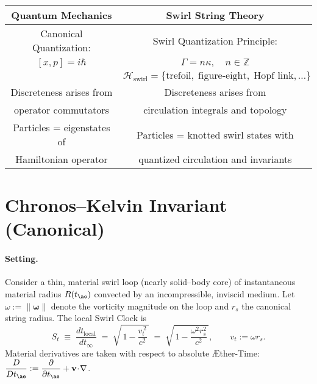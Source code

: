 \documentclass[11pt]{article}
\begin{document}
    \begin{center}
        \begin{tabular}{|c|c|}
            \hline
            \textbf{Quantum Mechanics} & \textbf{Swirl String Theory} \\
            \hline
            Canonical Quantization: & Swirl Quantization Principle: \\
            $[x, p] = i \hbar$ & $\Gamma = n \kappa, \quad n \in \mathbb{Z}$ \\[6pt]
            & $\mathcal{H}_\text{swirl} =
            \{ \text{trefoil}, \; \text{figure-eight}, \; \text{Hopf link}, \dots \}$ \\
            \hline
            Discreteness arises from & Discreteness arises from \\
            operator commutators & circulation integrals and topology \\
            \hline
            Particles = eigenstates of & Particles = knotted swirl states with \\
            Hamiltonian operator & quantized circulation and invariants \\
            \hline
        \end{tabular}
    \end{center}


    \section*{Chronos–Kelvin Invariant (Canonical)}
    \label{sec:chronos_kelvin}

    \paragraph{Setting.}
    Consider a thin, material swirl loop (nearly solid–body core) of instantaneous material radius
    $R(t_{\ae})$ convected by an incompressible, inviscid medium. Let $\omega:=\|\boldsymbol{\omega}\|$ denote the
    vorticity magnitude on the loop and $r_s$ the canonical string radius. The local Swirl Clock is
    \begin{equation}
        S_t \;\equiv\; \frac{dt_{\text{local}}}{dt_\infty}
        \;=\;
        \sqrt{\,1-\frac{v_t^{\,2}}{c^2}\,}
        \;=\;
        \sqrt{\,1-\frac{\omega^2 r_s^2}{c^2}\,},\qquad v_t:=\omega r_s .
        \label{eq:SwirlClock-def}
    \end{equation}
    Material derivatives are taken with respect to absolute Æther-Time:
    $\displaystyle \frac{D}{Dt_{\ae}}:=\frac{\partial}{\partial t_{\ae}}+\mathbf{v}\!\cdot\!\nabla$.
\end{document}
